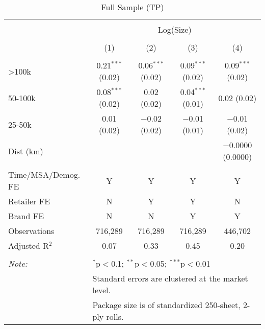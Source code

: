 
\begin{table}[!htbp] \centering 
  \caption{Full Sample (TP)} 
  \label{tab:packageSizeFull} 
\begin{tabular}{@{\extracolsep{5pt}}lcccc} 
\\[-1.8ex]\hline 
\hline \\[-1.8ex] 
 & \multicolumn{4}{c}{Log(Size)} \\ 
\\[-1.8ex] & (1) & (2) & (3) & (4)\\ 
\hline \\[-1.8ex] 
 >100k & 0.21$^{***}$ (0.02) & 0.06$^{***}$ (0.02) & 0.09$^{***}$ (0.02) & 0.09$^{***}$ (0.02) \\ 
  50-100k & 0.08$^{***}$ (0.02) & 0.02 (0.02) & 0.04$^{***}$ (0.01) & 0.02 (0.02) \\ 
  25-50k & 0.01 (0.02) & $-$0.02 (0.02) & $-$0.01 (0.01) & $-$0.01 (0.02) \\ 
  Dist (km) &  &  &  & $-$0.0000 (0.0000) \\ 
 \hline \\[-1.8ex] 
Time/MSA/Demog. FE & Y & Y & Y & Y \\ 
Retailer FE & N & Y & Y & N \\ 
Brand FE & N & N & Y & Y \\ 
Observations & 716,289 & 716,289 & 716,289 & 446,702 \\ 
Adjusted R$^{2}$ & 0.07 & 0.33 & 0.45 & 0.20 \\ 
\hline 
\hline \\[-1.8ex] 
\textit{Note:}  & \multicolumn{4}{l}{$^{*}$p$<$0.1; $^{**}$p$<$0.05; $^{***}$p$<$0.01} \\ 
 & \multicolumn{4}{l}{Standard errors are clustered at the market level.} \\ 
 & \multicolumn{4}{l}{Package size is of standardized 250-sheet, 2-ply rolls.} \\ 
\end{tabular} 
\end{table} 
